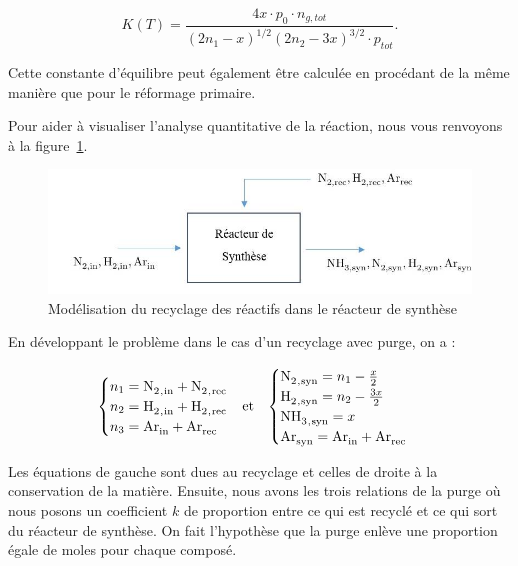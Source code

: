 $$K(T) = \frac{4x\cdot p_0\cdot n_{g,tot}}{(2n_1 - x)^{1/2} (2n_2 - 3x)^{3/2} \cdot p_{tot}}.$$

Cette constante d'équilibre peut également être calculée en procédant de la même manière que pour le réformage primaire. 

Pour aider à visualiser l'analyse quantitative de la réaction, nous vous renvoyons à la figure~\ref{fig:purge1}.

\begin{figure}
	\centering
	\includegraphics[scale=0.5]{media/reacteurNH3.jpg}
	\caption{Modélisation du recyclage des réactifs dans le réacteur de synthèse}
	\label{fig:purge1}
\end{figure}

En développant le problème dans le cas d'un recyclage avec purge, on a :

\begin{align}
	\notag
	\begin{cases}
	 n_1 = \ce{N2_{,in} + N2_{,rec}} \\
	 n_2 = \ce{H2_{,in} + H2_{,rec}} \\
	 n_3 = \ce{Ar_{in} + Ar_{rec}} \\
	\end{cases}
	 &  \text{et}  &
	\begin{cases}
	 \ce{N2_{,syn}} = n_1 - \frac{x}{2} \\
	 \ce{H2_{,syn}} = n_2 - \frac{3x}{2} \\
	 \ce{NH3_{,syn}} = x \\
	 \ce{Ar_{syn} = Ar_{in} + Ar_{rec}} \\ 
	\end{cases}
	\\
\end{align}

Les équations de gauche sont dues au recyclage et celles de droite 
à la conservation de la matière. Ensuite, nous avons les trois relations
de la purge où nous posons un coefficient $k$ de proportion entre ce qui
est recyclé et ce qui sort du réacteur de synthèse. On fait l'hypothèse
que la purge enlève une proportion égale de moles pour chaque composé.

